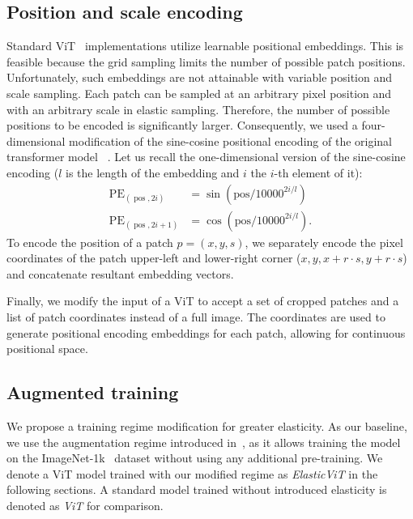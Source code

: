 \documentclass[10pt,twocolumn,letterpaper]{article}
\DeclareMathOperator{\pos}{pos}
\DeclareMathOperator{\PE}{PE}
\begin{document}

\subsection{Position and scale encoding} \label{exp:pos_scale_encodings}

Standard ViT~\cite{dosovitskiy2020vit} implementations utilize learnable positional embeddings. This is feasible because the grid sampling limits the number of possible patch positions. Unfortunately, such embeddings are not attainable with variable position and scale sampling. Each patch can be sampled at an arbitrary pixel position and with an arbitrary scale in elastic sampling. Therefore, the number of possible positions to be encoded is significantly larger. Consequently, we used a four-dimensional modification of the sine-cosine positional encoding of the original transformer model ~\cite{vaswani2017attention}. Let us recall the one-dimensional version of the sine-cosine encoding ($l$ is the length of the embedding and $i$ the $i$-th element of it): 
\begin{align*}
    \PE_{(\pos,2i)} &= \sin\left(\text{pos} / 10000^{2i/l}\right) \\
    \PE_{(\pos,2i+1)} &= \cos\left(\text{pos} / 10000^{2i/l}\right).
\end{align*}
To encode the position of a patch $p = (x, y, s)$, we separately encode the pixel coordinates of the patch upper-left and lower-right corner ($x, y, x + r \cdot s, y + r \cdot s$) and concatenate resultant embedding vectors.

Finally, we modify the input of a ViT to accept a set of cropped patches and a list of patch coordinates instead of a full image. The coordinates are used to generate positional encoding embeddings for each patch, allowing for continuous positional space. 

\subsection{Augmented training}



We propose a training regime modification for greater elasticity. As our baseline, we use the augmentation regime introduced in~\cite{touvron2022deit}, as it allows training the model on the ImageNet-1k~\cite{ILSVRC15} dataset without using any additional pre-training. We denote a ViT model trained with our modified regime as \textit{ElasticViT} in the following sections. A standard model trained without introduced elasticity is denoted as \textit{ViT} for comparison.
\end{document}
